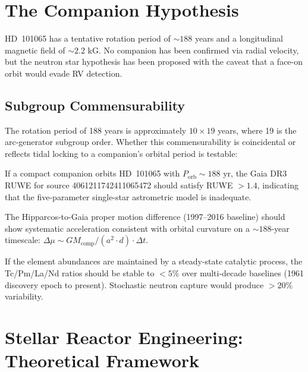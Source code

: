 \section{The Companion Hypothesis}
\label{sec:companion}

HD~101065 has a tentative rotation period of $\sim 188$ years \cite{hubrig2000}
and a longitudinal magnetic field of $\sim 2.2$ kG. No companion has been
confirmed via radial velocity, but the neutron star hypothesis has been
proposed \cite{gopka2004} with the caveat that a face-on orbit would evade
RV detection.

\subsection{Subgroup Commensurability}

The rotation period of 188 years is approximately $10 \times 19$ years,
where 19 is the arc-generator subgroup order. Whether this commensurability
is coincidental or reflects tidal locking to a companion's orbital period
is testable:

\begin{hypothesis}
If a compact companion orbits HD~101065 with $P_\text{orb} \sim 188$ yr,
the Gaia DR3 RUWE for source 4061211742411065472 should satisfy RUWE $> 1.4$,
indicating that the five-parameter single-star astrometric model is inadequate.
\end{hypothesis}

\begin{hypothesis}
The Hipparcos-to-Gaia proper motion difference (1997--2016 baseline) should
show systematic acceleration consistent with orbital curvature on a $\sim 188$-year
timescale: $\Delta\mu \sim GM_\text{comp} / (a^2 \cdot d) \cdot \Delta t$.
\end{hypothesis}

\begin{hypothesis}
If the element abundances are maintained by a steady-state catalytic process,
the Tc/Pm/La/Nd ratios should be stable to $< 5\%$ over multi-decade baselines
(1961 discovery epoch to present). Stochastic neutron capture would produce
$> 20\%$ variability.
\end{hypothesis}


\section{Stellar Reactor Engineering: Theoretical Framework}
\label{sec:reactor-engineering}

